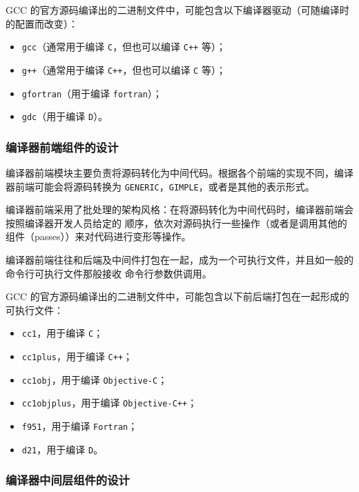\documentclass[12pt]{ctexrep}
\begin{document}
    GCC 的官方源码编译出的二进制文件中，可能包含以下编译器驱动（可随编译时的配置而改变）：

    \begin{itemize}
        \item \verb|gcc|（通常用于编译 \verb|C|，但也可以编译 \verb|C++| 等）；
        \item \verb|g++|（通常用于编译 \verb|C++|，但也可以编译 \verb|C| 等）；
        \item \verb|gfortran|（用于编译 \verb|fortran|）；
        \item \verb|gdc|（用于编译 \verb|D|）。
    \end{itemize}

    \subsubsection{编译器前端组件的设计}

    编译器前端模块主要负责将源码转化为中间代码。根据各个前端的实现不同，编译器前端可能会将源码转换为
    \verb|GENERIC|，\verb|GIMPLE|，或者是其他的表示形式。\cite{gcc-parsing-pass}

    编译器前端采用了批处理的架构风格：在将源码转化为中间代码时，编译器前端会按照编译器开发人员给定的
    顺序，依次对源码执行一些操作（或者是调用其他的组件（passes））来对代码进行变形等操作。

    编译器前端往往和后端及中间件打包在一起，成为一个可执行文件，并且如一般的命令行可执行文件那般接收
    命令行参数供调用。

    GCC 的官方源码编译出的二进制文件中，可能包含以下前后端打包在一起形成的可执行文件：

    \begin{itemize}
        \item \verb|cc1|，用于编译 \verb|C|；
        \item \verb|cc1plus|，用于编译 \verb|C++|；
        \item \verb|cc1obj|，用于编译 \verb|Objective-C|；
        \item \verb|cc1objplus|，用于编译 \verb|Objective-C++|；
        \item \verb|f951|，用于编译 \verb|Fortran|；
        \item \verb|d21|，用于编译 \verb|D|。
    \end{itemize}

    \subsubsection{编译器中间层组件的设计}
\end{document}
